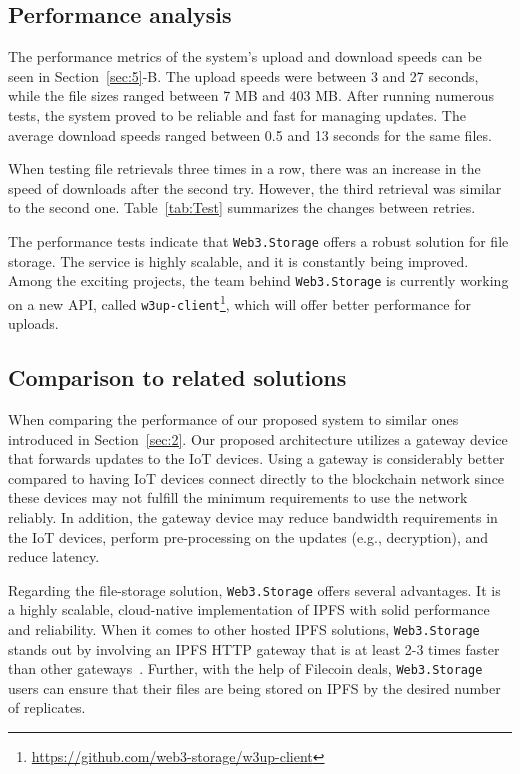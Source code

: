 \documentclass[conference]{IEEEtran}
\begin{document}
\subsection{Performance analysis}

The performance metrics of the system's upload and download speeds can be seen in Section~\ref{sec:5}-B. The upload speeds were between 3 and 27 seconds, while the file sizes ranged between 7 MB and 403 MB. After running numerous tests, the system proved to be reliable and fast for managing updates. The average download speeds ranged between 0.5 and 13 seconds for the same files. %

When testing file retrievals three times in a row, there was an increase in the speed of downloads after the second try. However, the third retrieval was similar to the second one. Table~\ref{tab:Test} summarizes the changes between retries.

The performance tests indicate that \texttt{Web3.Storage} offers a robust solution for file storage. The service is highly scalable, and it is constantly being improved. Among the exciting projects, the team behind \texttt{Web3.Storage} is currently working on a new API, called \texttt{w3up-client}\footnote{\url{https://github.com/web3-storage/w3up-client}}, which will offer better performance for uploads.

\subsection{Comparison to related solutions}

When comparing the performance of our proposed system to similar ones introduced in Section~\ref{sec:2}. Our proposed architecture utilizes a gateway device that forwards updates to the IoT devices. Using a gateway is considerably better compared to having IoT devices connect directly to the blockchain network since these devices may not fulfill the minimum requirements to use the network reliably. In addition, the gateway device may reduce bandwidth requirements in the IoT devices, perform pre-processing on the updates (e.g., decryption), and reduce latency.

Regarding the file-storage solution, \texttt{Web3.Storage} offers several advantages. It is a highly scalable, cloud-native implementation of IPFS with solid performance and reliability. When it comes to other hosted IPFS solutions, \texttt{Web3.Storage} stands out by involving an IPFS HTTP gateway that is at least 2-3 times faster than other gateways~\cite{3perf}. Further, with the help of Filecoin deals, \texttt{Web3.Storage} users can ensure that their files are being stored on IPFS by the desired number of replicates.
\end{document}
